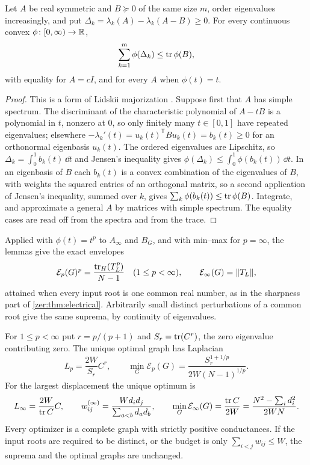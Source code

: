 \begin{lemma}\label{zer:lem:convex}
Let $A$ be real symmetric and $B\succeq0$ of the same size $m$, order eigenvalues increasingly, and
put $\Delta_k=\lambda_k(A)-\lambda_k(A-B)\ge0$. For every continuous convex
$\phi\colon[0,\infty)\to\mathbb{R}$,
\[
 \sum_{k=1}^m\phi(\Delta_k)\le\operatorname{tr}\phi(B),
\]
with equality for $A=cI$, and for every $A$ when $\phi(t)=t$.
\end{lemma}
\begin{proof}
This is a form of Lidskii majorization \cite[Theorem~2.1]{Argentati2008Bounds}. Suppose first that $A$
has simple spectrum. The discriminant of the characteristic polynomial of $A-tB$ is a polynomial in
$t$, nonzero at $0$, so only finitely many $t\in[0,1]$ have repeated eigenvalues; elsewhere
$-\lambda_k'(t)=u_k(t)^{\mathsf T}Bu_k(t)=b_k(t)\ge0$ for an orthonormal eigenbasis $u_k(t)$. The
ordered eigenvalues are Lipschitz, so $\Delta_k=\int_0^1b_k(t)\,\dd t$ and Jensen's inequality gives
$\phi(\Delta_k)\le\int_0^1\phi(b_k(t))\,\dd t$. In an eigenbasis of $B$ each $b_k(t)$ is a convex
combination of the eigenvalues of $B$, with weights the squared entries of an orthogonal matrix, so a
second application of Jensen's inequality, summed over $k$, gives $\sum_k\phi(b_k(t))\le\operatorname{tr}\phi(B)$.
Integrate, and approximate a general $A$ by matrices with simple spectrum. The equality cases are
read off from the spectra and from the trace.
\end{proof}

Applied with $\phi(t)=t^p$ to $A_\infty$ and $B_G$, and with min--max for $p=\infty$, the lemmas give
the exact envelopes
\begin{equation}\label{zer:eq:envelope}
 \mathcal E_p(G)^p=\frac{\operatorname{tr}_H(T_L^p)}{N-1}\quad(1\le p<\infty),\qquad\mathcal E_\infty(G)=\lVert T_L\rVert,
\end{equation}
attained when every input root is one common real number, as in the sharpness part of
\cref{zer:thm:electrical}. Arbitrarily small distinct perturbations of a common root give the same
suprema, by continuity of eigenvalues.

\begin{theorem}\label{zer:thm:minimax}
For $1\le p<\infty$ put $r=p/(p+1)$ and $S_r=\operatorname{tr}(C^r)$, the zero eigenvalue contributing zero. The
unique optimal graph has Laplacian
\[
 L_p=\frac{2W}{S_r}C^r,\qquad
 \min_G\mathcal E_p(G)=\frac{S_r^{1+1/p}}{2W(N-1)^{1/p}} .
\]
For the largest displacement the unique optimum is
\[
 L_\infty=\frac{2W}{\operatorname{tr} C}C,\qquad w^{(\infty)}_{ij}=\frac{Wd_id_j}{\sum_{a<b}d_ad_b},\qquad
 \min_G\mathcal E_\infty(G)=\frac{\operatorname{tr} C}{2W}=\frac{N^2-\sum_id_i^2}{2WN}.
\]
Every optimizer is a complete graph with strictly positive conductances. If the input roots are
required to be distinct, or the budget is only $\sum_{i<j}w_{ij}\le W$, the suprema and the optimal
graphs are unchanged.
\end{theorem}


